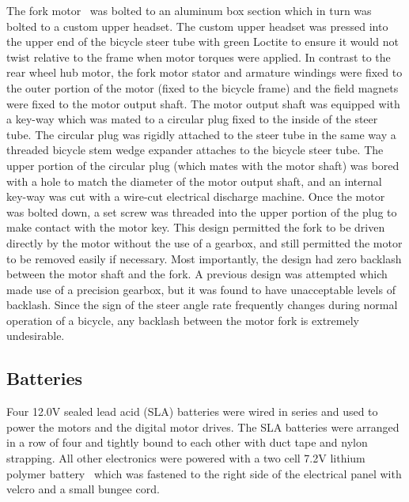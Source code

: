 The fork motor~\cite{TeknicM3441} was bolted to an aluminum box section which
in turn was bolted to a custom upper headset. The custom upper headset was
pressed into the upper end of the bicycle steer tube with green Loctite to
ensure it would not twist relative to the frame when motor torques were
applied. In contrast to the rear wheel hub motor, the fork motor stator and
armature windings were fixed to the outer portion of the motor (fixed to the
bicycle frame) and the field magnets were fixed to the motor output shaft.  The
motor output shaft was equipped with a key-way which was mated to a circular
plug fixed to the inside of the steer tube. The circular plug was rigidly
attached to the steer tube in the same way a threaded bicycle stem wedge
expander attaches to the bicycle steer tube. The upper portion of the circular
plug (which mates with the motor shaft) was bored with a hole to match the
diameter of the motor output shaft, and an internal key-way was cut with a
wire-cut electrical discharge machine. Once the motor was bolted down, a set
screw was threaded into the upper portion of the plug to make contact with the
motor key. This design permitted the fork to be driven directly by the motor
without the use of a gearbox, and still permitted the motor to be removed
easily if necessary. Most importantly, the design had zero backlash between the
motor shaft and the fork. A previous design was attempted which made use of a
precision gearbox, but it was found to have unacceptable levels of backlash.
Since the sign of the steer angle rate frequently changes during normal
operation of a bicycle, any backlash between the motor fork is extremely
undesirable.

\subsection{Batteries} \label{rb:subsec:batteries}
Four 12.0V sealed lead acid (SLA) batteries were wired in series and used to
power the motors and the digital motor drives. The SLA batteries were arranged
in a row of four and tightly bound to each other with duct tape and nylon
strapping. All other electronics were powered with a two cell 7.2V lithium
polymer battery~\cite{Zippy5000} which was fastened to the right side of the
electrical panel with velcro and a small bungee cord.

